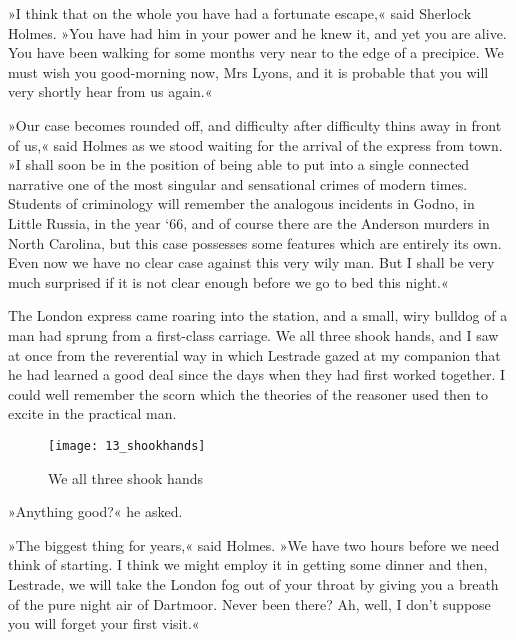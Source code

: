 »I think that on the whole you have had a fortunate escape,« said Sherlock Holmes. »You have had him in your power and he knew it, and yet you are alive. You have been walking for some months very near to the edge of a precipice. We must wish you good-morning now, Mrs Lyons, and it is probable that you will very shortly hear from us again.«

»Our case becomes rounded off, and difficulty after difficulty thins away in front of us,« said Holmes as we stood waiting for the arrival of the express from town. »I shall soon be in the position of being able to put into a single connected narrative one of the most singular and sensational crimes of modern times. Students of criminology will remember the analogous incidents in Godno, in Little Russia, in the year `66, and of course there are the Anderson murders in North Carolina, but this case possesses some features which are entirely its own. Even now we have no clear case against this very wily man. But I shall be very much surprised if it is not clear enough before we go to bed this night.«

The London express came roaring into the station, and a small, wiry bulldog of a man had sprung from a first-class carriage. We all three shook hands, and I saw at once from the reverential way in which Lestrade gazed at my companion that he had learned a good deal since the days when they had first worked together. I could well remember the scorn which the theories of the reasoner used then to excite in the practical man.

\begin{figure}[p]
\centering
\texttt{[image: 13\_shookhands]}
\caption{We all three shook hands}
\end{figure}

»Anything good?« he asked.

»The biggest thing for years,« said Holmes. »We have two hours before we need think of starting. I think we might employ it in getting some dinner and then, Lestrade, we will take the London fog out of your throat by giving you a breath of the pure night air of Dartmoor. Never been there? Ah, well, I don't suppose you will forget your first visit.«
